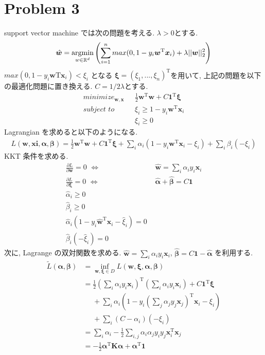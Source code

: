\documentclass[a4paper,10pt]{jsarticle}
\newcommand{\argmin}{\mathop{\rm argmin}\limits}
\begin{document}
\section*{Problem 3}
support vector machine では次の問題を考える. $\lambda > 0$とする.
\begin{equation}
 \hat{\bm{w}} = \argmin_{w \in \mathbb{R}^d}
  \left(\sum_{i=1}^{n}max(0, 1 - y_i\bm{w}^\mathrm{T}\bm{x}_i)
   + \lambda||\bm{w}||^2_2 \right)
\end{equation}
$max(0, 1 - y_i\bm{w}\mathrm{T}\bm{x}_i) < \xi_i$ となる
$\bm{\xi} = (\xi_1, ..., \xi_n)^\mathrm{T}$を用いて,
上記の問題を以下の最適化問題に置き換える.
$C=1/2\lambda$とする.
\begin{align*}
 minimize_{\bm{w}, \bm{x}} \,\,\,\,
 & \frac{1}{2}\bm{w}^\mathrm{T}\bm{w} + C\bm{1}^\mathrm{T}\bm{\xi}\\
 subject \,\, to \,\,\,\, &\xi_i \geq 1 - y_i\bm{w}^\mathrm{T}\bm{x}_i\\
 &\xi_i \geq 0
\end{align*}
Lagrangian を求めると以下のようになる.
\begin{align*}
 L(\bm{w}, \bm{xi}, \bm{\alpha}, \bm{\beta})
 = \frac{1}{2}\bm{w}^\mathrm{T}\bm{w} + C\bm{1}^\mathrm{T}\bm{\xi}
 + \sum_{i}\alpha_i(1 - y_i\bm{w}^\mathrm{T}\bm{x}_i - \xi_i)
 + \sum_{i}\beta_i(-\xi_i)
\end{align*}
KKT 条件を求める.
\begin{align*}
 \frac{\partial L}{\partial \bm{w}} = 0 \,\, \Longleftrightarrow
 &\,\,\hat{\bm{w}} = \sum_{i}\alpha_iy_i\bm{x}_i\\
 \frac{\partial L}{\partial \bm{\xi}} = 0 \,\, \Longleftrightarrow
 &\,\,\hat{\bm{\alpha}} + \hat{\bm{\beta}} = C\bm{1}\\
 \hat{\alpha}_i \geq 0\\
 \hat{\beta}_i \geq 0\\
 \hat{\alpha}_i(1 - y_i\hat{\bm{w}}^\mathrm{T}\bm{x}_i - \hat{\xi}_i) = 0\\
 \hat{\beta}_i(- \hat{\xi}_i) = 0
\end{align*}
次に, Lagrange の双対関数を求める.
$\hat{\bm{w}}=\sum_{i}\alpha_iy_i\bm{x}_i$,
$\hat{\bm{\beta}} = C\bm{1} - \hat{\bm{\alpha}}$
を利用する.
\begin{align*}
 \tilde{L}(\bm{\alpha}, \bm{\beta})
 & = \inf_{\bm{w}, \bm{\xi} \in D}L(\bm{w}, \bm{\xi}, \bm{\alpha}, \bm{\beta})\\
 & = \frac{1}{2}\left(\sum_{i}\alpha_iy_i\bm{x}_i\right)^\mathrm{T}
 \left(\sum_{i}\alpha_iy_i\bm{x}_i\right)
 + C\bm{1}^\mathrm{T}\bm{\xi}\\
 &\,\,\,\,\,\,\,\,+ \sum_{i}\alpha_i\left(1 - y_i
 \left(\sum_{j}\alpha_jy_j\bm{x}_j\right)^\mathrm{T}\bm{x}_i-\xi_i\right)\\
 &\,\,\,\,\,\,\,\,+ \sum_i(C - \alpha_i)(-\xi_i)\\
 & = \sum_i\alpha_i - \frac{1}{2}\sum_{i,j}\alpha_i\alpha_jy_iy_j
 \bm{x}^\mathrm{T}_i\bm{x}_j\\
 & = -\frac{1}{2}\bm{\alpha}^\mathrm{T}\bm{K}\mathrm{\bm{\alpha}}
 + \bm{\alpha}^\mathrm{T}\bm{1}
\end{align*}
\end{document}
